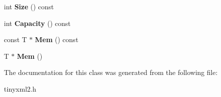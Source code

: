 \begin{DoxyCompactItemize}
\item 
\hypertarget{classtinyxml2_1_1_dyn_array_a1299b257b62ea6b4983c488867f219b0}{int {\bfseries Size} () const }\label{classtinyxml2_1_1_dyn_array_a1299b257b62ea6b4983c488867f219b0}

\item 
\hypertarget{classtinyxml2_1_1_dyn_array_a8edbe90ed53b2e46b1b5cf53b261e4e7}{int {\bfseries Capacity} () const }\label{classtinyxml2_1_1_dyn_array_a8edbe90ed53b2e46b1b5cf53b261e4e7}

\item 
\hypertarget{classtinyxml2_1_1_dyn_array_a1f39330daeb97d3d1dc3fc12dcf7ac67}{const T $\ast$ {\bfseries Mem} () const }\label{classtinyxml2_1_1_dyn_array_a1f39330daeb97d3d1dc3fc12dcf7ac67}

\item 
\hypertarget{classtinyxml2_1_1_dyn_array_a0e0d60b399d54fad5b33d5008bc59c8e}{T $\ast$ {\bfseries Mem} ()}\label{classtinyxml2_1_1_dyn_array_a0e0d60b399d54fad5b33d5008bc59c8e}

\end{DoxyCompactItemize}


The documentation for this class was generated from the following file\-:\begin{DoxyCompactItemize}
\item 
tinyxml2.\-h\end{DoxyCompactItemize}
